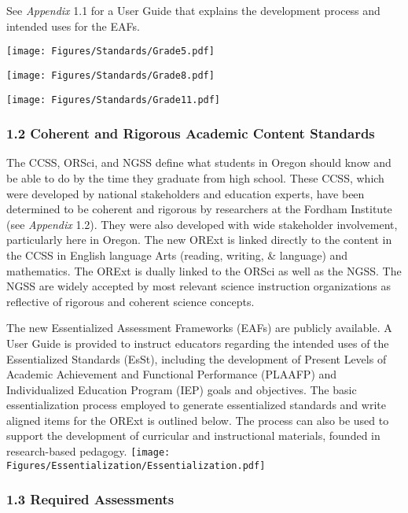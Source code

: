 \documentclass[]{article}
\begin{document}
See \emph{Appendix} 1.1 for a User Guide that explains the development
process and intended uses for the EAFs.

\FloatBarrier

\texttt{[image: Figures/Standards/Grade5.pdf]}

\texttt{[image: Figures/Standards/Grade8.pdf]}

\texttt{[image: Figures/Standards/Grade11.pdf]}

\clearpage

\hypertarget{coherent-and-rigorous-academic-content-standards}{%
\subsubsection{1.2 Coherent and Rigorous Academic Content
Standards}\label{coherent-and-rigorous-academic-content-standards}}

The CCSS, ORSci, and NGSS define what students in Oregon should know and
be able to do by the time they graduate from high school. These CCSS,
which were developed by national stakeholders and education experts,
have been determined to be coherent and rigorous by researchers at the
Fordham Institute (see \emph{Appendix} 1.2). They were also developed
with wide stakeholder involvement, particularly here in Oregon. The new
ORExt is linked directly to the content in the CCSS in English language
Arts (reading, writing, \& language) and mathematics. The ORExt is
dually linked to the ORSci as well as the NGSS. The NGSS are widely
accepted by most relevant science instruction organizations as
reflective of rigorous and coherent science concepts.

The new Essentialized Assessment Frameworks (EAFs) are publicly
available. A User Guide is provided to instruct educators regarding the
intended uses of the Essentialized Standards (EsSt), including the
development of Present Levels of Academic Achievement and Functional
Performance (PLAAFP) and Individualized Education Program (IEP) goals
and objectives. The basic essentialization process employed to generate
essentialized standards and write aligned items for the ORExt is
outlined below. The process can also be used to support the development
of curricular and instructional materials, founded in research-based
pedagogy. \FloatBarrier
\texttt{[image: Figures/Essentialization/Essentialization.pdf]} \newpage

\hypertarget{required-assessments}{%
\subsubsection{1.3 Required Assessments}\label{required-assessments}}
\end{document}
